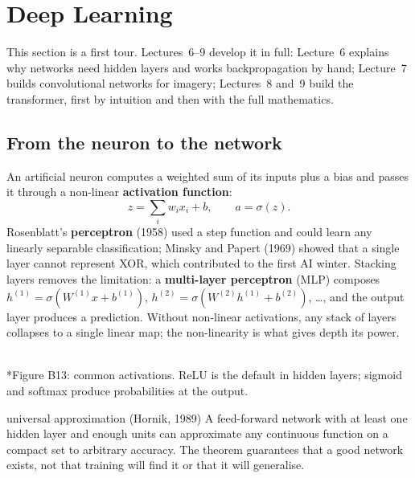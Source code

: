 \documentclass[11pt]{article}
\begin{document}
\section{Deep Learning}
\label{sec:dl}
This section is a first tour. Lectures~6--9 develop it in full: Lecture~6 explains why networks need hidden layers and works backpropagation by hand; Lecture~7 builds convolutional networks for imagery; Lectures~8 and~9 build the transformer, first by intuition and then with the full mathematics.

\subsection{From the neuron to the network}
An artificial neuron computes a weighted sum of its inputs plus a bias and passes it through a non-linear \textbf{activation function}:
\[z=\sum_iw_ix_i+b,\qquad a=\sigma(z).\]
Rosenblatt's \textbf{perceptron} (1958) used a step function and could learn any linearly separable classification; Minsky and Papert (1969) showed that a single layer cannot represent XOR, which contributed to the first AI winter. Stacking layers removes the limitation: a \textbf{multi-layer perceptron} (MLP) composes $h^{(1)}=\sigma(W^{(1)}x+b^{(1)})$, $h^{(2)}=\sigma(W^{(2)}h^{(1)}+b^{(2)})$, \ldots, and the output layer produces a prediction. Without non-linear activations, any stack of layers collapses to a single linear map; the non-linearity is what gives depth its power.
\begin{center}\\*{\small\color{GreyN}Figure B13: common activations. ReLU is the default in hidden layers; sigmoid and softmax produce probabilities at the output.}\end{center}
\begin{definition}{universal approximation (Hornik, 1989)}
A feed-forward network with at least one hidden layer and enough units can approximate any continuous function on a compact set to arbitrary accuracy. The theorem guarantees that a good network exists, not that training will find it or that it will generalise.
\end{definition}
\end{document}

